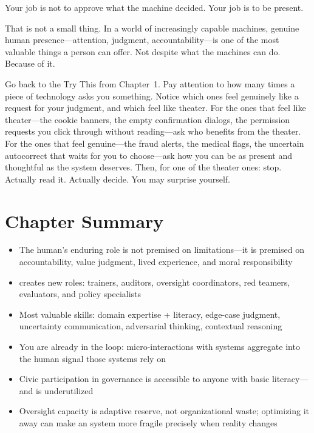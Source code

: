 Your job is not to approve what the machine decided. Your job is to be present.

That is not a small thing. In a world of increasingly capable machines, genuine human presence---attention, judgment, accountability---is one of the most valuable things a person can offer. Not despite what the machines can do. Because of it.

\begin{trythis}
Go back to the Try This from Chapter~1. Pay attention to how many times a piece of technology asks you something. Notice which ones feel genuinely like a request for your judgment, and which feel like theater. For the ones that feel like theater---the cookie banners, the empty confirmation dialogs, the permission requests you click through without reading---ask who benefits from the theater. For the ones that feel genuine---the fraud alerts, the medical \ai flags, the uncertain autocorrect that waits for you to choose---ask how you can be as present and thoughtful as the system deserves. Then, for one of the theater ones: stop. Actually read it. Actually decide. You may surprise yourself.
\end{trythis}

\section*{Chapter Summary}

\begin{keyconcept}
\begin{itemize}
  \item The human's enduring role is not premised on \ai limitations---it is premised on accountability, value judgment, lived experience, and moral responsibility
  \item \hitl creates new roles: \ai trainers, auditors, oversight coordinators, red teamers, evaluators, and policy specialists
  \item Most valuable \hitl skills: domain expertise + \ai literacy, edge-case judgment, uncertainty communication, adversarial thinking, contextual reasoning
  \item You are already in the loop: micro-interactions with \ai systems aggregate into the human signal those systems rely on
  \item Civic participation in \ai governance is accessible to anyone with basic \ai literacy---and is underutilized
  \item Oversight capacity is adaptive reserve, not organizational waste; optimizing it away can make an \ai system more fragile precisely when reality changes
\end{itemize}
\end{keyconcept}

